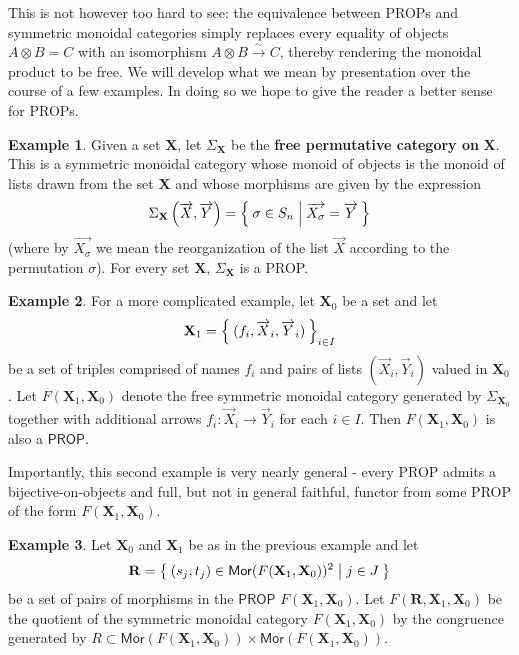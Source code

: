 \documentclass[pra,floatfix,
amsmath,superscriptaddress, 12pt]{article}
\theoremstyle{definition}
\newtheorem*{example}{Example}
\newcommand{\msf}[1]{\mathsf{#1}}
\begin{document}
This is not however too hard to see: the equivalence between \textsf{PROP}s and symmetric monoidal categories simply replaces every equality of objects $A\otimes B = C$ with an isomorphism $A \otimes B \overset{\sim}{\longrightarrow} C$, thereby rendering the monoidal product to be free. We will develop what we mean by presentation over the course of a few examples. In doing so we hope to give the reader a better sense for \textsf{PROP}s.

\begin{example}
Given a set $\mathbf{X}$, let $\Sigma_{\mathbf{X}}$ be the \textbf{free permutative category on} $\mathbf{X}$. This is a symmetric monoidal category whose monoid of objects is the monoid of lists drawn from the set $\mathbf{X}$ and whose morphisms are given by the expression
\[
    \Sigma_{\mathbf{X}}\left(\overrightarrow{X},\overrightarrow{Y}\right)
    =
    \Set{\sigma \in S_{n} | \overrightarrow{X_\sigma}=\overrightarrow{Y}}
\]
(where by $\overrightarrow{X_\sigma}$ we mean the reorganization of the list $\overrightarrow{X}$ according to the permutation $\sigma$). For every set $\mathbf{X}$, $\Sigma_{\mathbf{X}}$ is a \textsf{PROP}.
\end{example}

\begin{example} For a more complicated example, let $\mathbf{X}_0$ be a set and let
\[
    \mathbf{X}_1
    =
    \Set{(f_i,\overrightarrow{X}_i,\overrightarrow{Y}_i)}_{i\in I}
\]
be a set of triples comprised of names $f_i$ and pairs of lists $(\overrightarrow{X}_i,\overrightarrow{Y}_i)$ valued in $\mathbf{X}_0$. Let $F(\mathbf{X}_1,\mathbf{X}_0)$ denote the free symmetric monoidal category generated by $\Sigma_{\mathbf{X}_0}$ together with additional arrows $f_{i}:\overrightarrow{X}_i \longrightarrow \overrightarrow{Y}_i$ for each $i\in I$. Then $F(\mathbf{X}_1,\mathbf{X}_0)$ is also a $\msf{PROP}$.

\end{example}

Importantly, this second example is very nearly general - every \textsf{PROP} admits a bijective-on-objects and full, but not in general faithful, functor from some \textsf{PROP} of the form $F(\mathbf{X}_1,\mathbf{X}_0)$.

\begin{example}
 Let  $\mathbf{X}_0$ and $\mathbf{X}_1$ be as in the previous example and let
 \[
    \mathbf{R}=\Set{ (s_j,t_j) \in \mathsf{Mor}(F(\mathbf{X}_1,\mathbf{X}_0))^2 | j \in J}
 \]
 be a set of pairs of morphisms in the $\mathsf{PROP}$ $F(\mathbf{X}_1,\mathbf{X}_0)$. Let $F(\mathbf{R},\mathbf{X}_1,\mathbf{X}_0)$ be the quotient of the symmetric monoidal category $F(\mathbf{X}_1,\mathbf{X}_0)$ by the congruence generated by $R \subset \mathsf{Mor}(F(\mathbf{X}_1,\mathbf{X}_0)) \times \mathsf{Mor}(F(\mathbf{X}_1,\mathbf{X}_0))$.
\end{example}
\end{document}

